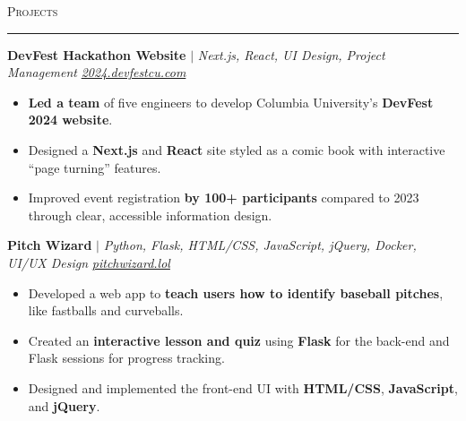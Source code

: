 \documentclass[11pt,letterpaper]{article}
\begin{document}

\vspace{4pt}
\textsc{\large{Projects}} 
\vspace{4pt}
\hrule
\begin{list}{}{\setlength{\leftmargin}{1em}\setlength{\rightmargin}{2pt}}
  
    \item
        \small{\textbf{DevFest Hackathon Website}} $|$ \small{\textit{Next.js, React, UI Design, Project Management}} \hfill \small{\textit{\href{https://2024.devfestcu.com/}{2024.devfestcu.com}}}
          \begin{itemize}[itemsep=-5pt, topsep=-2pt]
              \item \textbf{Led a team} of five engineers to develop Columbia University's \textbf{DevFest 2024 website}.
              \item Designed a \textbf{Next.js} and \textbf{React} site styled as a comic book with interactive ``page turning'' features.
              \item Improved event registration \textbf{by 100+ participants} compared to 2023 through clear, accessible information design.
          \end{itemize}
          \vspace{4pt}

    \item
        \small{\textbf{Pitch Wizard}} $|$ \small{\textit{Python, Flask, HTML/CSS, JavaScript, jQuery, Docker, UI/UX Design}} \hfill \small{\textit{\href{https://pitchwizard.lol/}{pitchwizard.lol}}}
          \begin{itemize}[itemsep=-5pt, topsep=-2pt]
              \item Developed a web app to \textbf{teach users how to identify baseball pitches}, like fastballs and curveballs.
              \item Created an \textbf{interactive lesson and quiz} using \textbf{Flask} for the back-end and Flask sessions for progress tracking.
              \item Designed and implemented the front-end UI with \textbf{HTML/CSS}, \textbf{JavaScript}, and \textbf{jQuery}.
          \end{itemize}
          \vspace{4pt}
    

\end{list}
\end{document}
